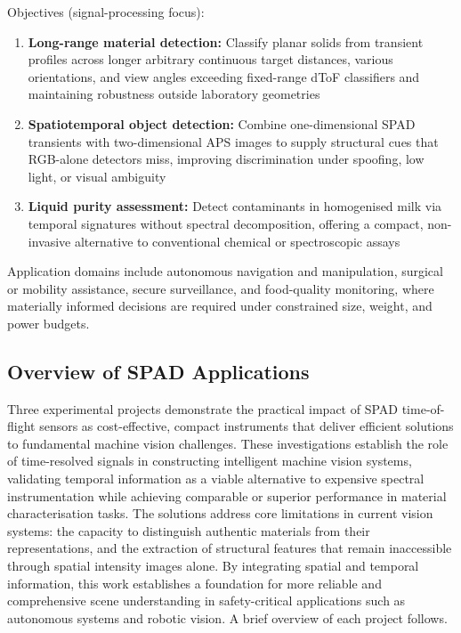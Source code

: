 \documentclass[12pt,a4paper,oneside]{report}
\begin{document}
Objectives (signal-processing focus):
\begin{enumerate}[leftmargin=*]
    \item \textbf{Long-range material detection:} Classify planar solids from transient profiles across longer arbitrary continuous target distances, various orientations, and view angles exceeding fixed-range dToF classifiers and maintaining robustness outside laboratory geometries 
    \item \textbf{Spatiotemporal object detection:} Combine one-dimensional SPAD transients with two-dimensional APS images to supply structural cues that RGB-alone detectors miss, improving discrimination under spoofing, low light, or visual ambiguity
    \item \textbf{Liquid purity assessment:} Detect contaminants in homogenised milk via temporal signatures without spectral decomposition, offering a compact, non-invasive alternative to conventional chemical or spectroscopic assays 
\end{enumerate}

Application domains include autonomous navigation and manipulation, surgical or mobility assistance, secure surveillance, and food-quality monitoring, where materially informed decisions are required under constrained size, weight, and power budgets.

\subsection{Overview of SPAD Applications}
\label{subsec:spad_applications_overview}
Three experimental projects demonstrate the practical impact of SPAD time-of-flight sensors as cost-effective, compact instruments that deliver efficient solutions to fundamental machine vision challenges. These investigations establish the role of time-resolved signals in constructing intelligent machine vision systems, validating temporal information as a viable alternative to expensive spectral instrumentation while achieving comparable or superior performance in material characterisation tasks. The solutions address core limitations in current vision systems: the capacity to distinguish authentic materials from their representations, and the extraction of structural features that remain inaccessible through spatial intensity images alone. By integrating spatial and temporal information, this work establishes a foundation for more reliable and comprehensive scene understanding in safety-critical applications such as autonomous systems and robotic vision. A brief overview of each project follows.
\end{document}
